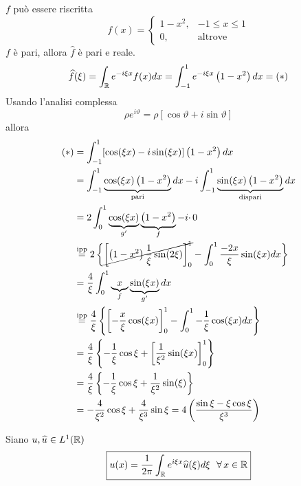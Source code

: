 $f$ può essere riscritta
\begin{equation*}
f( x) =\begin{cases}
1-x^{2} , & -1\leqslant x\leqslant 1\\
0, & \text{altrove}
\end{cases}
\end{equation*}
$f$ è pari, allora $\hat{f}$ è pari e reale.
\begin{equation*}
\widehat{f}( \xi ) =\int _{\mathbb{R} } e^{-i\xi x} f( x) dx=\int ^{1}_{-1} e^{-i\xi x}\left( 1-x^{2}\right) dx=( *)
\end{equation*}
Usando l'analisi complessa
\begin{equation*}
\rho e^{i\vartheta } =\rho [\cos \vartheta +i\sin \vartheta ]
\end{equation*}
allora
\begin{align*}
( *) & =\int ^{1}_{-1}[\cos( \xi x) -i\sin( \xi x)]\left( 1-x^{2}\right) dx\\
 & =\int ^{1}_{-1}\underbrace{\cos( \xi x)\left( 1-x^{2}\right)}_{\text{pari}} dx-i\int ^{1}_{-1}\underbrace{\sin( \xi x)\left( 1-x^{2}\right)}_{\text{dispari}} dx\\
 & =2\int ^{1}_{0}\underbrace{\cos( \xi x)}_{g'}\underbrace{\left( 1-x^{2}\right)}_{f} -i\cdotp 0\\
 & \overset{\text{ipp}}{=} 2\left\{\cancel{\left[\left( 1-x^{2}\right)\frac{1}{\xi }\sin( 2\xi )\right]^{1}_{0}} -\int ^{1}_{0}\frac{-2x}{\xi }\sin( \xi x) dx\right\}\\
 & =\frac{4}{\xi }\int ^{1}_{0}\underbrace{x}_{f}\underbrace{\sin( \xi x)}_{g'} dx\\
 & \overset{\text{ipp}}{=}\frac{4}{\xi }\left\{\left[ -\frac{x}{\xi }\cos( \xi x)\right]^{1}_{0} -\int ^{1}_{0} -\frac{1}{\xi }\cos( \xi x) dx\right\}\\
 & =\frac{4}{\xi }\left\{-\frac{1}{\xi }\cos \xi +\left[\frac{1}{\xi ^{2}}\sin( \xi x)\right]^{1}_{0}\right\}\\
 & =\frac{4}{\xi }\left\{-\frac{1}{\xi }\cos \xi +\frac{1}{\xi ^{2}}\sin( \xi )\right\}\\
 & =-\frac{4}{\xi ^{2}}\cos \xi +\frac{4}{\xi ^{3}}\sin \xi =4\left(\frac{\sin \xi -\xi \cos \xi }{\xi ^{3}}\right)
\end{align*}
\begin{thm}
 Siano $u,\widehat{u} \in L^{1}(\mathbb{R} )$
\begin{equation*}
\boxed{u( x) =\frac{1}{2\pi }\int _{\RR } e^{i\xi x}\hat{u}( \xi ) d\xi \ \ \forall x\in \RR }
\end{equation*}
\end{thm}
